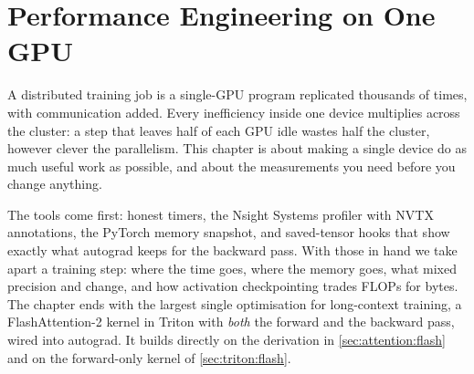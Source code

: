 \chapter{Performance Engineering on One GPU}\label{ch:perf}

A distributed training job is a single-GPU program replicated thousands of times, with
communication added. Every inefficiency inside one device multiplies across the cluster:
a step that leaves half of each GPU idle wastes half the cluster, however clever the
parallelism. This chapter is about making a single device do as much useful work as possible,
and about the measurements you need before you change anything.

The tools come first: honest timers, the Nsight Systems profiler with NVTX annotations, the
PyTorch memory snapshot, and saved-tensor hooks that show exactly what autograd keeps for the
backward pass. With those in hand we take apart a training step: where the time goes, where the
memory goes, what mixed precision and  change, and how activation
checkpointing trades FLOPs for bytes. The chapter ends with the largest single optimisation for
long-context training, a FlashAttention-2 kernel in Triton with \emph{both} the forward and the
backward pass, wired into autograd. It builds directly on the derivation in
\cref{sec:attention:flash} and on the forward-only kernel of \cref{sec:triton:flash}.

